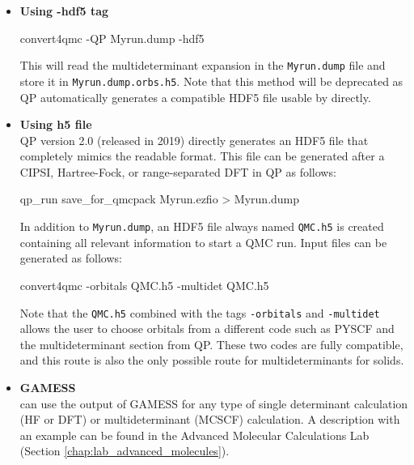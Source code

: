 \begin{itemize}
 \item \textbf{Using -hdf5 tag}\\

\begin{shade}
 convert4qmc -QP Myrun.dump -hdf5
\end{shade}

This will read the multideterminant expansion in the \texttt{Myrun.dump} file and store it in \texttt{Myrun.dump.orbs.h5}. Note that this method will be deprecated as QP automatically generates a compatible HDF5 file usable by \qmcpack directly. \\

 \item \textbf{Using h5 file }\\

QP version 2.0 (released in 2019) directly generates an HDF5 file that completely mimics the \qmcpack readable format. This file can be generated after a CIPSI, Hartree-Fock, or range-separated DFT in QP as follows: \\

\begin{shade}
 qp_run save_for_qmcpack Myrun.ezfio > Myrun.dump
\end{shade}

In addition to \texttt{Myrun.dump}, an HDF5 file always named \texttt{QMC.h5} is created containing all relevant information to start a QMC run. Input files can be generated as follows:\\

\begin{shade}
 convert4qmc -orbitals QMC.h5 -multidet QMC.h5
\end{shade}

Note that the \texttt{QMC.h5} combined with the tags \texttt{-orbitals} and \texttt{-multidet} allows the user to choose orbitals from a different code such as PYSCF and the multideterminant section from QP. These two codes are fully compatible, and this route is also the only possible route for multideterminants for solids. 

\item \textbf{GAMESS}\\
\qmcpack can use the output of GAMESS\cite{schmidt93} for any type of single determinant calculation (HF or DFT) or multideterminant (MCSCF) calculation. A description with an example can be found in the Advanced Molecular Calculations Lab (Section \ref{chap:lab_advanced_molecules}).
\end{itemize}

